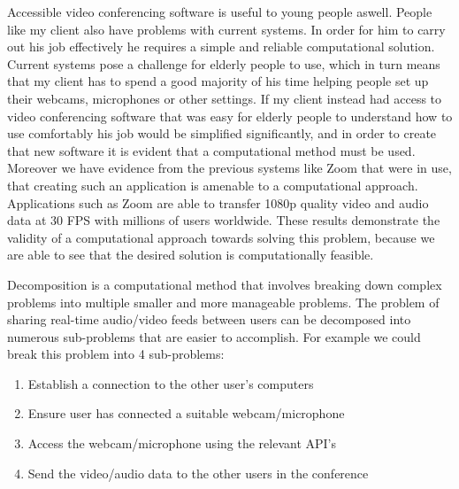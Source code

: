 Accessible video conferencing software is useful to young 
people aswell. People like my client also have problems with 
current systems. In order for him to carry out his job 
effectively he requires a simple and reliable computational
solution. Current systems pose a challenge for elderly people 
to use, which in turn means that my client has to spend a good
majority of his time helping people set up their webcams,
microphones or other settings. If my client instead had access
to video conferencing software that was easy for elderly people
to understand how to use comfortably his job would be 
simplified significantly, and in order to create that new 
software it is evident that a computational method must be 
used. Moreover we have evidence from the previous systems like 
Zoom that were in use, that creating such an application is
amenable to a computational approach. Applications such as 
Zoom are able to transfer 1080p quality video and audio data
at 30 FPS with millions of users worldwide. These results 
demonstrate the validity of a computational approach towards 
solving this problem, because we are able to see that the 
desired solution is computationally feasible. \vspace{0.2cm}

Decomposition is a computational method that involves breaking
down complex problems into multiple smaller and more 
manageable problems. The problem of sharing real-time 
audio/video feeds between users can be decomposed into numerous
sub-problems that are easier to accomplish. For example we 
could break this problem into 4 sub-problems:

\begin{enumerate}
  \item Establish a connection to the other user's computers 
  \item Ensure user has connected a suitable webcam/microphone
  \item Access the webcam/microphone using the relevant API's
  \item{Send the video/audio data to the other users in the 
        conference}
\end{enumerate}

